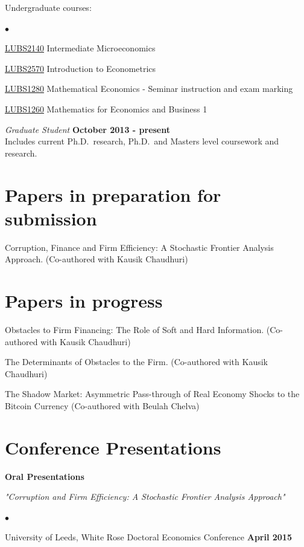 \documentclass[margin,line,9pt]{res}
\newenvironment{list1}{
  \begin{list}{\ding{113}}{%
      \setlength{\itemsep}{0in}
      \setlength{\parsep}{0in} \setlength{\parskip}{0in}
      \setlength{\topsep}{0in} \setlength{\partopsep}{0in} 
      \setlength{\leftmargin}{0.17in}}}{\end{list}}
\newenvironment{list2}{
  \begin{list}{$\bullet$}{%
      \setlength{\itemsep}{0in}
      \setlength{\parsep}{0in} \setlength{\parskip}{0in}
      \setlength{\topsep}{0in} \setlength{\partopsep}{0in} 
      \setlength{\leftmargin}{0.2in}}}{\end{list}}
\begin{document}
\begin{resume}
Undergraduate courses:\\
\vspace*{-.1in}
\begin{list2}
\item \href{http://webprod3.leeds.ac.uk/catalogue/dynmodules.asp?Y=201314&M=LUBS-2104}{LUBS2140} Intermediate Microeconomics 
\item \href{http://webprod3.leeds.ac.uk/catalogue/dynmodules.asp?Y=201415&M=LUBS-2570}{LUBS2570} Introduction to Econometrics
\item \href{http://webprod3.leeds.ac.uk/catalogue/dynmodules.asp?Y=201415&M=LUBS-1260}{LUBS1280} Mathematical Economics - Seminar instruction and exam marking
\item \href{http://webprod3.leeds.ac.uk/catalogue/dynmodules.asp?Y=201415&M=LUBS-1280}{LUBS1260} Mathematics for Economics and Business 1
\end{list2}

{\em Graduate Student} \hfill {\bf October 2013 - present}\\
Includes current Ph.D.~research, Ph.D.~and Masters level coursework and
research.

\section{\sc Papers in preparation for submission}

Corruption, Finance and Firm Efficiency: A Stochastic Frontier Analysis Approach. (Co-authored with Kausik Chaudhuri)

\section{\sc Papers in progress}

Obstacles to Firm Financing: The Role of Soft and Hard Information. (Co-authored with Kausik Chaudhuri)

The Determinants of Obstacles to the Firm. (Co-authored with Kausik Chaudhuri)

The Shadow Market: Asymmetric Pass-through of Real Economy Shocks to the Bitcoin Currency (Co-authored with Beulah Chelva)
\section{\sc Conference Presentations}
\textbf{Oral Presentations}
\vspace*{.05in} 
\begin{list1}
\item[] \textit{"Corruption and Firm Efficiency: A Stochastic Frontier Analysis Approach"}
\vspace*{.1in} 
\begin{list2}
\item University of Leeds, White Rose Doctoral Economics Conference \hfill \bf{April 2015}
\end{list2}
\end{list1}


\end{resume}
\end{document}
